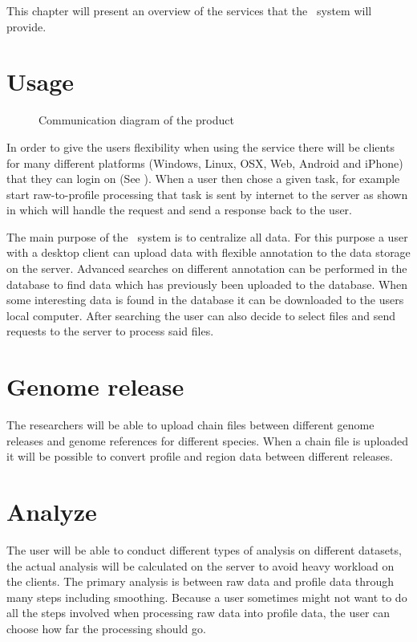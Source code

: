 


This chapter will present an overview of the services that the \appName\ system will provide. 

\section{Usage}



\begin{figure}[h]
\caption{Communication diagram of the product}
\label{con_serviceDescription}
\end{figure}
	
In order to give the users flexibility when using the service there will be clients for many different platforms (Windows, Linux, OSX, Web, Android and iPhone) that they can login on (See ). 
When a user then chose a given task, for example start raw-to-profile processing that task is sent by internet to the server as shown in  which will handle the request and send a response back to the user.

The main purpose of the \appName\ system is to centralize all data. For this purpose a user with a desktop client can upload data with flexible annotation to the data storage on the server. 
Advanced searches on different annotation can be performed in the database to find data which has previously been uploaded to the database. When some interesting data is found in the database it can be downloaded to the users local computer. 
After searching the user can also decide to select files and send requests to the server to process said files.


\section{Genome release}
The researchers will be able to upload chain files between different genome releases and genome references for different species. When a chain file is uploaded it will be possible to convert profile and region data between different releases. 

\section{Analyze}
The user will be able to conduct different types of analysis on different datasets, the actual analysis will be calculated on the server to avoid heavy workload on the clients. The primary analysis is between raw data and profile data through many steps including smoothing. Because a user sometimes might not want to do all the steps involved when processing raw data into profile data, the user can choose how far the processing should go.

